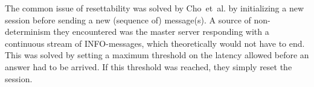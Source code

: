 The common issue of resettability was solved by Cho~et~al. by initializing a
new session before sending a new (sequence of) message(s). A source of
non-determinism they encountered was the master server responding with a
continuous stream of INFO-messages, which theoretically would not have to end.
This was solved by setting a maximum threshold on the latency allowed before an
answer had to be arrived. If this threshold was reached, they simply reset the
session.

